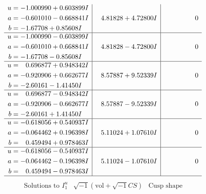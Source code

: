 \documentclass[1p]{elsarticle_modified}
\theoremstyle{definition}
\newcommand{\I}{\sqrt{-1}}
\begin{document}
$$\begin{array}{c|c|c}
\begin{aligned}
u &= -1.000990 + 0.603899 I \\
a &= -0.601010 - 0.668841 I \\
b &= -1.67708 + 0.85608 I\end{aligned}
 & \phantom{-}4.81828 + 4.72800 I & \phantom{-0.000000 } 0 \\ \hline\begin{aligned}
u &= -1.000990 - 0.603899 I \\
a &= -0.601010 + 0.668841 I \\
b &= -1.67708 - 0.85608 I\end{aligned}
 & \phantom{-}4.81828 - 4.72800 I & \phantom{-0.000000 } 0 \\ \hline\begin{aligned}
u &= \phantom{-}0.696877 + 0.948342 I \\
a &= -0.920906 + 0.662677 I \\
b &= -2.60161 - 1.41450 I\end{aligned}
 & \phantom{-}8.57887 + 9.52339 I & \phantom{-0.000000 } 0 \\ \hline\begin{aligned}
u &= \phantom{-}0.696877 - 0.948342 I \\
a &= -0.920906 - 0.662677 I \\
b &= -2.60161 + 1.41450 I\end{aligned}
 & \phantom{-}8.57887 - 9.52339 I & \phantom{-0.000000 } 0 \\ \hline\begin{aligned}
u &= -0.618056 + 0.540937 I \\
a &= -0.064462 + 0.196398 I \\
b &= \phantom{-}0.459494 + 0.978463 I\end{aligned}
 & \phantom{-}5.11024 + 1.07610 I & \phantom{-0.000000 } 0 \\ \hline\begin{aligned}
u &= -0.618056 - 0.540937 I \\
a &= -0.064462 - 0.196398 I \\
b &= \phantom{-}0.459494 - 0.978463 I\end{aligned}
 & \phantom{-}5.11024 - 1.07610 I & \phantom{-0.000000 } 0\\
 \hline 
 \end{array}$$\newpage$$\begin{array}{c|c|c}  
\text{Solutions to }I^u_{1}& \I (\text{vol} + \sqrt{-1}CS) & \text{Cusp shape}\\
 \hline 
\begin{aligned}

\end{aligned}
\end{array}$$
\end{document}
